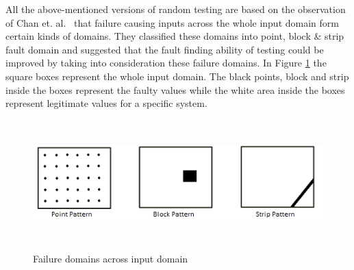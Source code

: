 All the above-mentioned versions of random testing are based on the observation of Chan et. al.~\cite{Chan1996} that failure causing inputs across the whole input domain form certain kinds of domains. They classified these domains into point, block \& strip fault domain and suggested that the fault finding ability of testing could be improved by taking into consideration these failure domains. In Figure \ref{fig:patterns} the square boxes represent the whole input domain. The black points, block and strip inside the boxes represent the faulty values while the white area inside the boxes represent legitimate values for a specific system. 

\begin{figure}[h]
\centering
\includegraphics[width=14cm,height=5cm]{chapter5/ART_Patterns.png}
\caption{Failure domains across input domain~\cite{Chan1996}}
\label{fig:patterns}
\end{figure}






